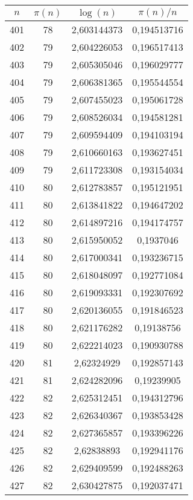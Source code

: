 {\begin{minipage}[!h]{0.45\textwidth}\centering
\tiny
\begin{longtable}{cccc} \hline
\(n\) & \(\pi(n)\) & \(\log(n)\) & \(\pi(n)/n\) \\ \hline
401 & 78 & 2,603144373 & 0,194513716 \\ \hline
402 & 79 & 2,604226053 & 0,196517413 \\ \hline
403 & 79 & 2,605305046 & 0,196029777 \\ \hline
404 & 79 & 2,606381365 & 0,195544554 \\ \hline
405 & 79 & 2,607455023 & 0,195061728 \\ \hline
406 & 79 & 2,608526034 & 0,194581281 \\ \hline
407 & 79 & 2,609594409 & 0,194103194 \\ \hline
408 & 79 & 2,610660163 & 0,193627451 \\ \hline
409 & 79 & 2,611723308 & 0,193154034 \\ \hline
410 & 80 & 2,612783857 & 0,195121951 \\ \hline
411 & 80 & 2,613841822 & 0,194647202 \\ \hline
412 & 80 & 2,614897216 & 0,194174757 \\ \hline
413 & 80 & 2,615950052 & 0,1937046 \\ \hline
414 & 80 & 2,617000341 & 0,193236715 \\ \hline
415 & 80 & 2,618048097 & 0,192771084 \\ \hline
416 & 80 & 2,619093331 & 0,192307692 \\ \hline
417 & 80 & 2,620136055 & 0,191846523 \\ \hline
418 & 80 & 2,621176282 & 0,19138756 \\ \hline
419 & 80 & 2,622214023 & 0,190930788 \\ \hline
420 & 81 & 2,62324929 & 0,192857143 \\ \hline
421 & 81 & 2,624282096 & 0,19239905 \\ \hline
422 & 82 & 2,625312451 & 0,194312796 \\ \hline
423 & 82 & 2,626340367 & 0,193853428 \\ \hline
424 & 82 & 2,627365857 & 0,193396226 \\ \hline
425 & 82 & 2,62838893 & 0,192941176 \\ \hline
426 & 82 & 2,629409599 & 0,192488263 \\ \hline
427 & 82 & 2,630427875 & 0,192037471 \\ \hline

\end{longtable}
\end{minipage}}
